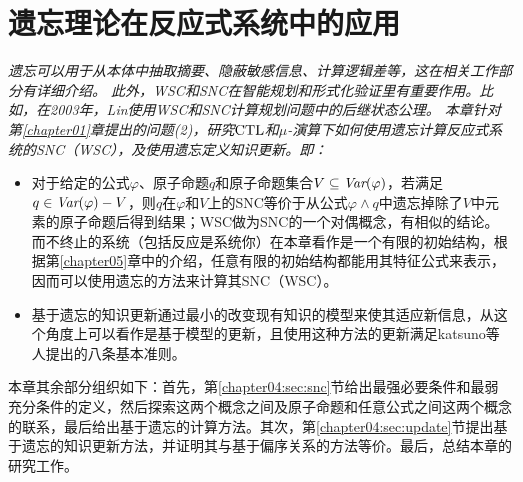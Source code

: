 
\chapter{遗忘理论在反应式系统中的应用}
\label{chapter04}

{\em
遗忘可以用于从本体中抽取摘要、隐蔽敏感信息、计算逻辑差等，这在相关工作部分有详细介绍。
此外，WSC和SNC在智能规划和形式化验证里有重要作用。比如，在2003年，Lin使用WSC和SNC计算规划问题中的后继状态公理。
本章针对第\ref{chapter01}章提出的问题(2)，研究$\textrm{CTL}$和$\mu$-演算下如何使用遗忘计算反应式系统的SNC（WSC），及使用遗忘定义知识更新。即：
\begin{itemize}
	\item 对于给定的公式$\varphi$、原子命题$q$和原子命题集合$V\subseteq \textit{Var}(\varphi)$，若满足$q \in \textit{Var}(\varphi)-V$，则$q$在$\varphi$和$V$上的SNC等价于从公式$\varphi \wedge q$中遗忘掉除了$V$中元素的原子命题后得到结果；WSC做为SNC的一个对偶概念，有相似的结论。而不终止的系统（包括反应是系统你）在本章看作是一个有限的初始结构，根据第\ref{chapter05}章中的介绍，任意有限的初始结构都能用其特征公式来表示，因而可以使用遗忘的方法来计算其SNC（WSC）。
	\item 基于遗忘的知识更新通过最小的改变现有知识的模型来使其适应新信息，从这个角度上可以看作是基于模型的更新，且使用这种方法的更新满足katsuno等人提出的八条基本准则\cite{katsuno91mendelzon}。
\end{itemize}


本章其余部分组织如下：首先，第\ref{chapter04:sec:snc}节给出最强必要条件和最弱充分条件的定义，然后探索这两个概念之间及原子命题和任意公式之间这两个概念的联系，最后给出基于遗忘的计算方法。其次，第\ref{chapter04:sec:update}节提出基于遗忘的知识更新方法，并证明其与基于偏序关系的方法等价。最后，总结本章的研究工作。}

